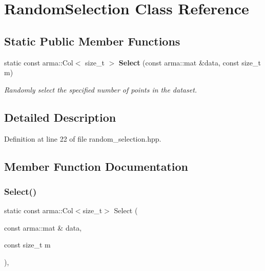 \section{Random\+Selection Class Reference}
\label{classmlpack_1_1kernel_1_1RandomSelection}
\subsection*{Static Public Member Functions}
\begin{DoxyCompactItemize}
\item 
static const arma\+::\+Col$<$ size\+\_\+t $>$ \textbf{ Select} (const arma\+::mat \&data, const size\+\_\+t m)
\begin{DoxyCompactList}\small\item\em Randomly select the specified number of points in the dataset. \end{DoxyCompactList}\end{DoxyCompactItemize}


\subsection{Detailed Description}


Definition at line 22 of file random\+\_\+selection.\+hpp.



\subsection{Member Function Documentation}
\mbox{\label{classmlpack_1_1kernel_1_1RandomSelection_aa80002884200d7b328b897a56b158192}} 
\subsubsection{Select()}
{\footnotesize\ttfamily static const arma\+::\+Col$<$size\+\_\+t$>$ Select (\begin{DoxyParamCaption}\item[{const arma\+::mat \&}]{data,  }\item[{const size\+\_\+t}]{m }\end{DoxyParamCaption})\hspace{0.3cm}{\ttfamily [inline]}, {\ttfamily [static]}}



